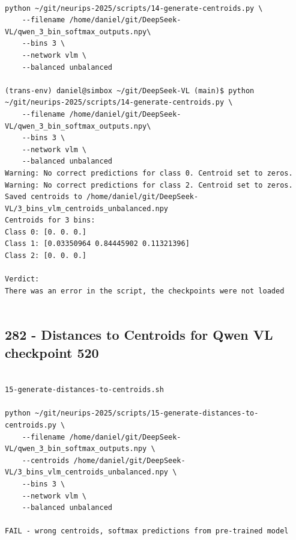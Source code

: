 \begin{verbatim}

python ~/git/neurips-2025/scripts/14-generate-centroids.py \
    --filename /home/daniel/git/DeepSeek-VL/qwen_3_bin_softmax_outputs.npy\
    --bins 3 \
    --network vlm \
    --balanced unbalanced
    
(trans-env) daniel@simbox ~/git/DeepSeek-VL (main)$ python ~/git/neurips-2025/scripts/14-generate-centroids.py \
    --filename /home/daniel/git/DeepSeek-VL/qwen_3_bin_softmax_outputs.npy\
    --bins 3 \
    --network vlm \
    --balanced unbalanced
Warning: No correct predictions for class 0. Centroid set to zeros.
Warning: No correct predictions for class 2. Centroid set to zeros.
Saved centroids to /home/daniel/git/DeepSeek-VL/3_bins_vlm_centroids_unbalanced.npy
Centroids for 3 bins:
Class 0: [0. 0. 0.]
Class 1: [0.03350964 0.84445902 0.11321396]
Class 2: [0. 0. 0.]

Verdict:
There was an error in the script, the checkpoints were not loaded
    
\end{verbatim}

\subsection{282 - Distances to Centroids for Qwen VL checkpoint 520}
\label{app_res:282}

\begin{verbatim}

15-generate-distances-to-centroids.sh

python ~/git/neurips-2025/scripts/15-generate-distances-to-centroids.py \
    --filename /home/daniel/git/DeepSeek-VL/qwen_3_bin_softmax_outputs.npy \
    --centroids /home/daniel/git/DeepSeek-VL/3_bins_vlm_centroids_unbalanced.npy \
    --bins 3 \
    --network vlm \
    --balanced unbalanced

FAIL - wrong centroids, softmax predictions from pre-trained model
    
\end{verbatim}

